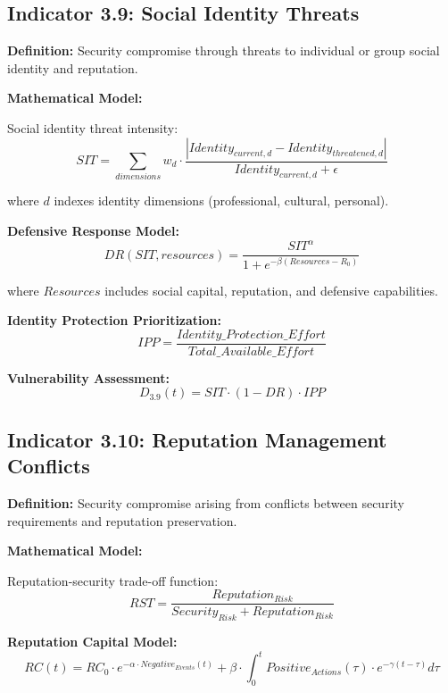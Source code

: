 \documentclass[11pt,a4paper]{article}
\begin{document}
\subsection{Indicator 3.9: Social Identity Threats}

\textbf{Definition:} Security compromise through threats to individual or group social identity and reputation.

\textbf{Mathematical Model:}

Social identity threat intensity:
\begin{equation}
SIT = \sum_{dimensions} w_d \cdot \frac{|Identity_{current,d} - Identity_{threatened,d}|}{Identity_{current,d} + \epsilon}
\end{equation}

where $d$ indexes identity dimensions (professional, cultural, personal).

\textbf{Defensive Response Model:}
\begin{equation}
DR(SIT, resources) = \frac{SIT^{\alpha}}{1 + e^{-\beta(Resources - R_0)}}
\end{equation}

where $Resources$ includes social capital, reputation, and defensive capabilities.

\textbf{Identity Protection Prioritization:}
\begin{equation}
IPP = \frac{Identity\_Protection\_Effort}{Total\_Available\_Effort}
\end{equation}

\textbf{Vulnerability Assessment:}
\begin{equation}
D_{3.9}(t) = SIT \cdot (1 - DR) \cdot IPP
\end{equation}

\subsection{Indicator 3.10: Reputation Management Conflicts}

\textbf{Definition:} Security compromise arising from conflicts between security requirements and reputation preservation.

\textbf{Mathematical Model:}

Reputation-security trade-off function:
\begin{equation}
RST = \frac{Reputation_{Risk}}{Security_{Risk} + Reputation_{Risk}}
\end{equation}

\textbf{Reputation Capital Model:}
\begin{equation}
RC(t) = RC_0 \cdot e^{-\alpha \cdot Negative_{Events}(t)} + \beta \cdot \int_0^t Positive_{Actions}(\tau) \cdot e^{-\gamma(t-\tau)} d\tau
\end{equation}
\end{document}
